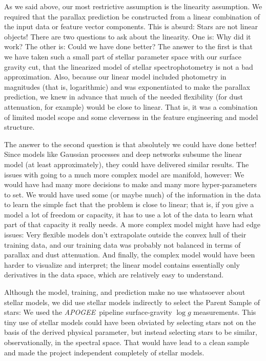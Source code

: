 \documentclass[modern]{aastex62}
\newcommand{\acronym}[1]{{\small{#1}}}
\newcommand{\project}[1]{\textsl{#1}}
\newcommand{\apogee}{\project{\acronym{APOGEE}}}
\newcommand{\logg}{\log g}
\begin{document}
As we said above, our most restrictive assumption is the linearity assumption.
We required that the parallax prediction be constructed from a linear combination
of the input data or feature vector components.
This is absurd: Stars are not linear objects!
There are two questions to ask about the linearity.
One is: Why did it work? The other is: Could we have done better?
The answer to the first is that we have taken such a small part of stellar parameter
space with our surface gravity cut, that the linearized model of stellar
spectrophotometry is not a bad approximation.
Also, because our linear model included photometry in magnitudes (that is, logarithmic)
and was exponentiated to make the parallax prediction, we knew in advance that much
of the needed flexibility (for dust attenuation, for example) would be close to
linear.
That is, it was a combination of limited model scope and some cleverness in the
feature engineering and model structure.

The answer to the second question is that absolutely we could have done better!
Since models like Gaussian processes and deep networks subsume the linear model
(at least approximately), they could have delivered similar results.
The issues with going to a much more complex model are manifold, however:
We would have had many more decisions to make and many more hyper-parameters
to set.
We would have used some (or maybe much) of the information in the data to learn
the simple fact that the problem is close to linear; that is, if you give a model
a lot of freedom or capacity, it has to use a lot of the data to learn what part
of that capacity it really needs.
A more complex model might have had edge issues: Very flexible models don't extrapolate
outside the convex hull of their training data, and our training data was probably not
balanced in terms of parallax and dust attenuation.
And finally, the complex model would have been harder to visualize and interpret;
the linear model contains essentially only derivatives in the data space, which are
relatively easy to understand.

Although the model, training, and prediction make no use whatsoever about stellar
models, we did use stellar models indirectly to select the Parent Sample of stars:
We used the \apogee\ pipeline surface-gravity $\logg$ measurements.
This tiny use of stellar models could have been obviated by selecting stars not
on the basis of the derived physical parameter, but instead selecting stars to
be similar, observationally, in the spectral space.
That would have lead to a clean sample and made the project independent completely
of stellar models.
\end{document}
